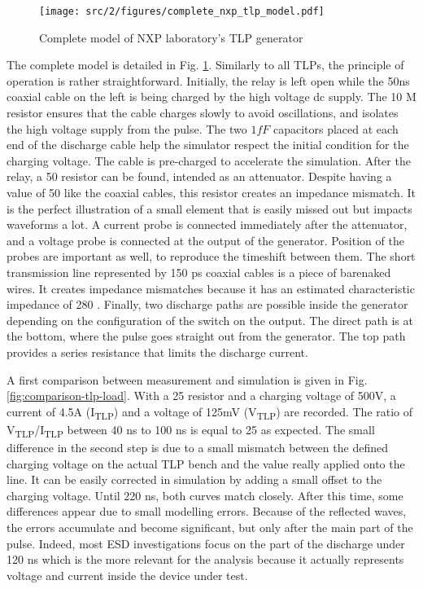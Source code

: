 \begin{figure}[!h]
  \centering
  \texttt{[image: src/2/figures/complete\_nxp\_tlp\_model.pdf]}
  \caption{Complete model of NXP laboratory's TLP generator}
  \label{fig:complete-tlp-model}
\end{figure}

The complete model is detailed in Fig. \ref{fig:complete-tlp-model}.
Similarly to all TLPs, the principle of operation is rather straightforward.
Initially, the relay is left open while the 50ns coaxial cable on the left is being charged by the high voltage \gls{dc} supply.
The 10 M\textOmega{} resistor ensures that the cable charges slowly to avoid oscillations, and isolates the high voltage supply from the pulse.
The two $1 fF$ capacitors placed at each end of the discharge cable help the simulator respect the initial condition for the charging voltage.
The cable is pre-charged to accelerate the simulation.
After the relay, a 50 \textOmega{} resistor can be found, intended as an attenuator.
Despite having a value of 50\textOmega{} like the coaxial cables, this resistor creates an impedance mismatch.
It is the perfect illustration of a small element that is easily missed out but impacts waveforms a lot.
A current probe is connected immediately after the attenuator, and a voltage probe is connected at the output of the generator.
Position of the probes are important as well, to reproduce the timeshift between them.
The short transmission line represented by 150 ps coaxial cables is a piece of barenaked wires.
It creates impedance mismatches because it has an estimated characteristic impedance of 280 \textOmega{}.
Finally, two discharge paths are possible inside the generator depending on the configuration of the switch on the output.
The direct path is at the bottom, where the pulse goes straight out from the generator.
The top path provides a series resistance that limits the discharge current.

A first comparison between measurement and simulation is given in Fig. \ref{fig:comparison-tlp-load}.
With a 25\textOmega{} resistor and a charging voltage of 500V, a current of 4.5A (I\textsubscript{TLP}) and a voltage of 125mV (V\textsubscript{TLP}) are recorded.
The ratio of V\textsubscript{TLP}/I\textsubscript{TLP} between 40 ns to 100 ns is equal to 25\textOmega{} as expected.
The small difference in the second step is due to a small mismatch between the defined charging voltage on the actual TLP bench and the value really applied onto the line.
It can be easily corrected in simulation by adding a small offset to the charging voltage.
Until 220 ns, both curves match closely.
After this time, some differences appear due to small modelling errors.
Because of the reflected waves, the errors accumulate and become significant, but only after the main part of the pulse.
Indeed, most ESD investigations focus on the part of the discharge under 120 ns which is the more relevant for the analysis because it actually represents voltage and current inside the device under test.

